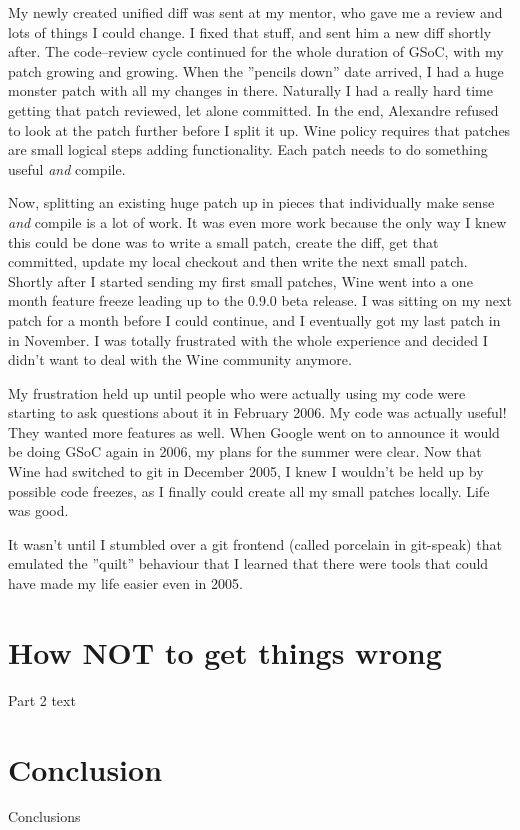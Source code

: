 My newly created unified diff was sent at my mentor, who gave me a review and
lots of things I could change. I fixed that stuff, and sent him a new diff
shortly after. The code--review cycle continued for the whole duration of GSoC,
with my patch growing and growing. When the ''pencils down'' date arrived, I had
a huge monster patch with all my changes in there. Naturally I had a really hard
time getting that patch reviewed, let alone committed. In the end, Alexandre
refused to look at the patch further before I split it up. Wine policy requires
that patches are small logical steps adding functionality. Each patch needs to
do something useful \emph{and} compile.

Now, splitting an existing huge patch up in pieces that individually make sense
\emph{and} compile is a lot of work. It was even more work because the only way
I knew this could be done was to write a small patch, create the diff, get that
committed, update my local checkout and then write the next small patch. Shortly
after I started sending my first small patches, Wine went into a one month
feature freeze leading up to the 0.9.0 beta release. I was sitting on my next
patch for a month before I could continue, and I eventually got my last patch in
in November. I was totally frustrated with the whole experience and decided I
didn't want to deal with the Wine community anymore.

My frustration held up until people who were actually using my code were
starting to ask questions about it in February 2006. My code was actually
useful! They wanted more features as well. When Google went on to announce it
would be doing GSoC again in 2006, my plans for the summer were clear. Now that
Wine had switched to git in December 2005, I knew I wouldn't be held up by
possible code freezes, as I finally could create all my small patches locally.
Life was good.

It wasn't until I stumbled over a git frontend (called porcelain in git-speak)
that emulated the ''quilt'' behaviour that I learned that there were tools that
could have made my life easier even in 2005.


\section*{How NOT to get things wrong}

Part 2 text


\section*{Conclusion}

Conclusions
